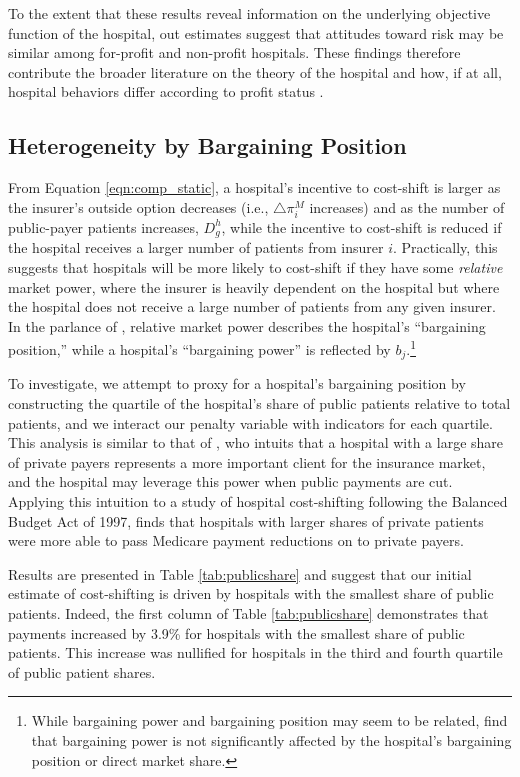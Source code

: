 \documentclass[12pt]{article}
\begin{document}
To the extent that these results reveal information on the underlying objective function of the hospital, out estimates suggest that attitudes toward risk may be similar among for-profit and non-profit hospitals. These findings therefore contribute the broader literature on the theory of the hospital and how, if at all, hospital behaviors differ according to profit status \citep{sloan2001,duggan2002,horwitz2005,horwitz2009,david2009}.

\subsection{Heterogeneity by Bargaining Position}
From Equation \ref{eqn:comp_static}, a hospital's incentive to cost-shift is larger as the insurer's outside option decreases (i.e., $\triangle \pi_{i}^{M}$ increases) and as the number of public-payer patients increases, $D_{g}^{h}$, while the incentive to cost-shift is reduced if the hospital receives a larger number of patients from insurer $i$. Practically, this suggests that hospitals will be more likely to cost-shift if they have some \textit{relative} market power, where the insurer is heavily dependent on the hospital but where the hospital does not receive a large number of patients from any given insurer. In the parlance of \cite{lewis2015}, relative market power describes the hospital's ``bargaining position,'' while a hospital's ``bargaining power'' is reflected by $b_{j}$.\footnote{While bargaining power and bargaining position may seem to be related, \cite{lewis2015} find that bargaining power is not significantly affected by the hospital's bargaining position or direct market share.}

To investigate, we attempt to proxy for a hospital's bargaining position by constructing the quartile of the hospital's share of public patients relative to total patients, and we interact our penalty variable with indicators for each quartile. This analysis is similar to that of \cite{wu2010}, who intuits that a hospital with a large share of private payers represents a more important client for the insurance market, and the hospital may leverage this power when public payments are cut. Applying this intuition to a study of hospital cost-shifting following the Balanced Budget Act of 1997, \cite{wu2010} finds that hospitals with larger shares of private patients were more able to pass Medicare payment reductions on to private payers.

Results are presented in Table \ref{tab:publicshare} and suggest that our initial estimate of cost-shifting is driven by hospitals with the smallest share of public patients. Indeed, the first column of Table \ref{tab:publicshare} demonstrates that payments increased by 3.9\% for hospitals with the smallest share of public patients. This increase was nullified for hospitals in the third and fourth quartile of public patient shares.
\end{document}
